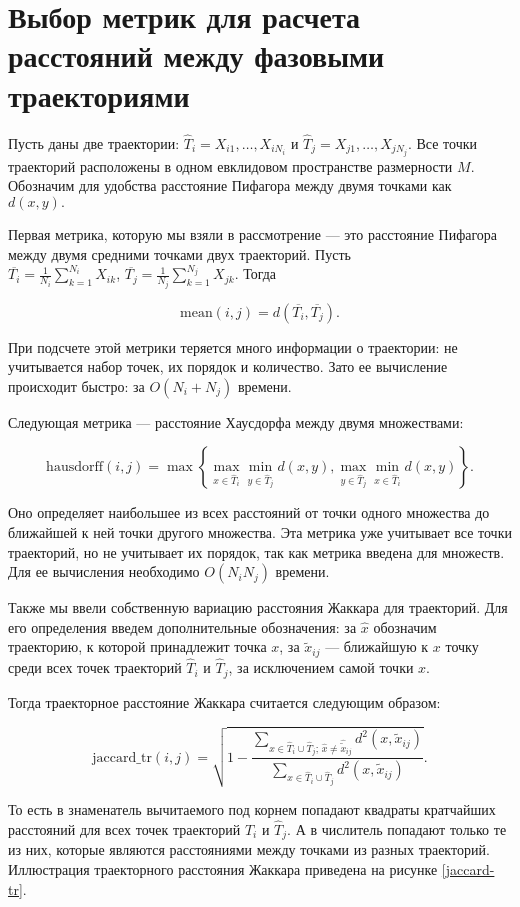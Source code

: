 \section{Выбор метрик для расчета расстояний между фазовыми траекториями}

Пусть даны две траектории: $\hat{T}_i = X_{i1},\ldots,X_{i N_i}$ и $\hat{T}_j = X_{j1},\ldots,X_{j N_j}$. Все точки траекторий расположены в одном евклидовом пространстве размерности $M$. Обозначим для удобства расстояние Пифагора между двумя точками как $d(x, y).$

Первая метрика, которую мы взяли в рассмотрение --- это расстояние Пифагора между двумя средними точками двух траекторий. Пусть\\ $\overline{T_i} = \frac{1}{N_i}\sum_{k=1}^{N_i} X_{ik}$, $\overline{T_j} = \frac{1}{N_j}\sum_{k=1}^{N_j} X_{jk}$. Тогда

$$\text{mean}(i, j) = d(\overline{T_i}, \overline{T_j}).$$

При подсчете этой метрики теряется много информации о траектории: не учитывается набор точек, их порядок и количество. Зато ее вычисление происходит быстро: за $O(N_i + N_j)$ времени.

Следующая метрика --- расстояние Хаусдорфа между двумя множествами:

$$\text{hausdorff}(i, j) = \max\left\{\max_{x\in\hat{T}_i} \min_{y\in\hat{T}_j} d(x, y), \max_{y\in\hat{T}_j} \min_{x\in\hat{T}_i} d(x, y)\right\}.$$

Оно определяет наибольшее из всех расстояний от точки одного множества до ближайшей к ней точки другого множества. Эта метрика уже учитывает все точки траекторий, но не учитывает их порядок, так как метрика введена для множеств. Для ее вычисления необходимо $O(N_iN_j)$ времени.

Также мы ввели собственную вариацию расстояния Жаккара для траекторий. Для его определения введем дополнительные обозначения: за $\hat{x}$ обозначим траекторию, к которой принадлежит точка $x$, за $\tilde{x}_{ij}$ --- ближайшую к $x$ точку среди всех точек траекторий $\hat{T}_i$ и $\hat{T}_j$, за исключением самой точки $x$.

Тогда траекторное расстояние Жаккара считается следующим образом:

$$\text{jaccard\_tr}(i, j) = \sqrt{1 - \frac{\sum_{x \in \hat{T}_i \cup \hat{T}_j; \, \hat{x} \neq \hat{\tilde{x}}_{ij}} d^2(x, \tilde{x}_{ij})}{\sum_{x \in \hat{T}_i \cup \hat{T}_j} d^2(x, \tilde{x}_{ij})}}.$$

То есть в знаменатель вычитаемого под корнем попадают квадраты кратчайших расстояний для всех точек траекторий $\hat{T}_i$ и $\hat{T}_j$. А в числитель попадают только те из них, которые являются расстояниями между точками из разных траекторий. Иллюстрация траекторного расстояния Жаккара приведена на рисунке \ref{jaccard-tr}.

